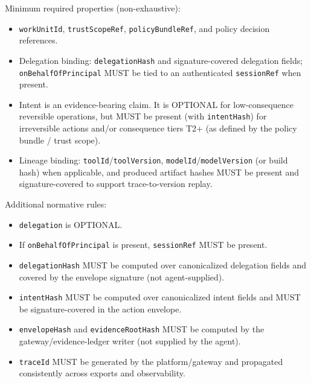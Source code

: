 \documentclass[11pt]{article}
\begin{document}
\begin{Shaded}
\begin{Highlighting}[]
\AttributeTok{    }\KeywordTok{:}\AttributeTok{ }
\AttributeTok{  }\KeywordTok{:}
\AttributeTok{    }\KeywordTok{:}\AttributeTok{ }
\AttributeTok{    }\KeywordTok{:}\AttributeTok{ }
\AttributeTok{  }\KeywordTok{:}
\AttributeTok{    }\KeywordTok{:}\AttributeTok{ }
\AttributeTok{    }\KeywordTok{:}\AttributeTok{ }
\AttributeTok{    }\KeywordTok{:}\AttributeTok{ }
\end{Highlighting}
\end{Shaded}

Minimum required properties (non-exhaustive):

\begin{itemize}
\tightlist
\item
  \texttt{workUnitId}, \texttt{trustScopeRef}, \texttt{policyBundleRef},
  and policy decision references.
\item
  Delegation binding: \texttt{delegationHash} and signature-covered
  delegation fields; \texttt{onBehalfOfPrincipal} MUST be tied to an
  authenticated \texttt{sessionRef} when present.
\item
  Intent is an evidence-bearing claim. It is OPTIONAL for
  low-consequence reversible operations, but MUST be present (with
  \texttt{intentHash}) for irreversible actions and/or consequence tiers
  T2+ (as defined by the policy bundle / trust scope).
\item
  Lineage binding: \texttt{toolId}/\texttt{toolVersion},
  \texttt{modelId}/\texttt{modelVersion} (or build hash) when
  applicable, and produced artifact hashes MUST be present and
  signature-covered to support trace-to-version replay.
\end{itemize}

Additional normative rules:

\begin{itemize}
\tightlist
\item
  \texttt{delegation} is OPTIONAL.
\item
  If \texttt{onBehalfOfPrincipal} is present, \texttt{sessionRef} MUST
  be present.
\item
  \texttt{delegationHash} MUST be computed over canonicalized delegation
  fields and covered by the envelope signature (not agent-supplied).
\item
  \texttt{intentHash} MUST be computed over canonicalized intent fields
  and MUST be signature-covered in the action envelope.
\item
  \texttt{envelopeHash} and \texttt{evidenceRootHash} MUST be computed
  by the gateway/evidence-ledger writer (not supplied by the agent).
\item
  \texttt{traceId} MUST be generated by the platform/gateway and
  propagated consistently across exports and observability.
\end{itemize}
\end{document}
